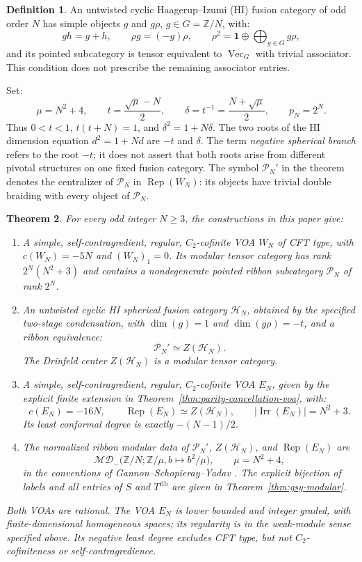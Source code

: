 \documentclass[11pt,a4paper]{article}
\numberwithin{equation}{section}
\newtheorem{theorem}{Theorem}[section]
\theoremstyle{definition}\newtheorem{definition}[theorem]{Definition}
\theoremstyle{remark}\newtheorem{remark}[theorem]{Remark}
\newcommand{\Rep}{\operatorname{Rep}}\newcommand{\Ext}{\operatorname{Ext}}
\newcommand{\parityrank}{p_N}
\begin{document}
\begin{definition}
An untwisted cyclic Haagerup--Izumi (HI) fusion category of odd order $N$
has simple objects $g$ and $g\rho$, $g\in G=\mathbb Z/N$, with:
\[
 gh=g+h,\qquad \rho g=(-g)\rho,\qquad
 \rho^2=\mathbf1\oplus\bigoplus_{g\in G}g\rho,
\]
and its pointed subcategory is tensor equivalent to
$\operatorname{Vec}_{G}$ with trivial associator. This condition does
not prescribe the remaining associator entries.
\end{definition}

Set:
\[
 \mu=N^2+4,\qquad
 t=\frac{\sqrt\mu-N}{2},\qquad
 \delta=t^{-1}=\frac{N+\sqrt\mu}{2},\qquad \parityrank=2^N.
\]
Thus $0<t<1$, $t(t+N)=1$, and $\delta^2=1+N\delta$.
The two roots of the HI dimension equation $d^2=1+Nd$ are $-t$ and
$\delta$. The term \emph{negative spherical branch} refers to the root
$-t$; it does not assert that both roots arise from different pivotal
structures on one fixed fusion category.
The symbol $\mathcal P_N'$ in the theorem denotes the centralizer of
$\mathcal P_N$ in $\operatorname{Rep}(W_N)$: its objects have trivial
double braiding with every object of $\mathcal P_N$.

\begin{theorem}\label{thm:main}\label{r:thm:main}
For every odd integer $N\geq3$, the constructions in this paper give:
\begin{enumerate}
\item A simple, self-contragredient, regular, $C_2$-cofinite VOA $W_N$
of CFT type, with $c(W_N)=-5N$ and $(W_N)_1=0$.
Its modular tensor category has rank $2^N(N^2+3)$ and contains a
nondegenerate pointed ribbon subcategory $\mathcal P_N$ of rank $2^N$.
\item An untwisted cyclic HI spherical fusion category $\mathcal H_N$,
obtained by the specified two-stage condensation, with
$\dim(g)=1$ and $\dim(g\rho)=-t$, and a ribbon equivalence:
\[
 \mathcal P_N'\simeq Z(\mathcal H_N).
\]
The Drinfeld center $Z(\mathcal H_N)$ is a modular tensor category.
\item A simple, self-contragredient, regular, $C_2$-cofinite VOA $E_N$,
given by the explicit finite extension in
Theorem~\ref{thm:parity-cancellation-voa}, with:
\[
 c(E_N)=-16N,\qquad
 \operatorname{Rep}(E_N)\simeq Z(\mathcal H_N),\qquad
 |\operatorname{Irr}(E_N)|=N^2+3.
\]
Its least conformal degree is exactly $-(N-1)/2$.
\item The normalized ribbon modular data of
$\mathcal P_N'$, $Z(\mathcal H_N)$, and $\Rep(E_N)$ are
\[
 \mathcal{MD}_{-}\bigl(\mathbb Z/N;\mathbb Z/\mu,
                            b\longmapsto b^2/\mu\bigr),
 \qquad \mu=N^2+4,
\]
in the conventions of Gannon--Schopieray--Yadav
\cite[Appendix F.1]{gsy}. The explicit bijection of labels and all
entries of $S$ and $T^{\mathrm{rib}}$ are given in
Theorem~\ref{thm:gsy-modular}.
\end{enumerate}
Both VOAs are rational. The VOA $E_N$ is lower bounded and integer
graded, with finite-dimensional homogeneous spaces; its regularity
is in the weak-module sense specified above. Its negative least
degree excludes CFT type, but not $C_2$-cofiniteness or
self-contragredience.
\end{theorem}
\end{document}
